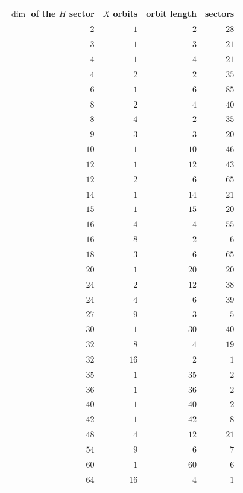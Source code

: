\begin{tabular}{rrrr}
\hline
$\dim$ of the $H$ sector & $X$ orbits & orbit length & sectors \\
\hline
$2$ & $1$ & $2$ & $28$ \\
$3$ & $1$ & $3$ & $21$ \\
$4$ & $1$ & $4$ & $21$ \\
$4$ & $2$ & $2$ & $35$ \\
$6$ & $1$ & $6$ & $85$ \\
$8$ & $2$ & $4$ & $40$ \\
$8$ & $4$ & $2$ & $35$ \\
$9$ & $3$ & $3$ & $20$ \\
$10$ & $1$ & $10$ & $46$ \\
$12$ & $1$ & $12$ & $43$ \\
$12$ & $2$ & $6$ & $65$ \\
$14$ & $1$ & $14$ & $21$ \\
$15$ & $1$ & $15$ & $20$ \\
$16$ & $4$ & $4$ & $55$ \\
$16$ & $8$ & $2$ & $6$ \\
$18$ & $3$ & $6$ & $65$ \\
$20$ & $1$ & $20$ & $20$ \\
$24$ & $2$ & $12$ & $38$ \\
$24$ & $4$ & $6$ & $39$ \\
$27$ & $9$ & $3$ & $5$ \\
$30$ & $1$ & $30$ & $40$ \\
$32$ & $8$ & $4$ & $19$ \\
$32$ & $16$ & $2$ & $1$ \\
$35$ & $1$ & $35$ & $2$ \\
$36$ & $1$ & $36$ & $2$ \\
$40$ & $1$ & $40$ & $2$ \\
$42$ & $1$ & $42$ & $8$ \\
$48$ & $4$ & $12$ & $21$ \\
$54$ & $9$ & $6$ & $7$ \\
$60$ & $1$ & $60$ & $6$ \\
$64$ & $16$ & $4$ & $1$ \\
\hline
\end{tabular}
